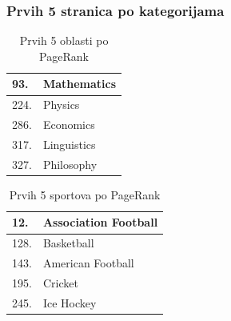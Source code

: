 \documentclass[11pt]{beamer}
\begin{document}
\begin{frame}
     \frametitle{Prvih 5 stranica po kategorijama}

    \begin{table}[]
    \large
    \centering
    \begin{tabular}{|l|l|}
    \hline
    93.                 & Mathematics                            \\ \hline
    224.                 & Physics                         \\ \hline
    286.                 & Economics                \\ \hline
    317.                 & Linguistics                     \\ \hline
    327.                 & Philosophy \\ \hline
    \end{tabular}
    \caption{Prvih 5 oblasti po PageRank}
    \label{tabelaoblasti5}
    \end{table}

    \begin{table}[]
    \large
    \centering
    \begin{tabular}{|l|l|}
    \hline
    12.                 & Association Football                            \\ \hline
    128.                 & Basketball  \\ \hline
    143.  & American Football \\ \hline
    195.                 & Cricket                \\ \hline
    245.                 & Ice Hockey                     \\ \hline
    \end{tabular}
    \caption{Prvih 5 sportova po PageRank}
    \label{tabelasportova5}
    \end{table}
\end{frame}
\end{document}
